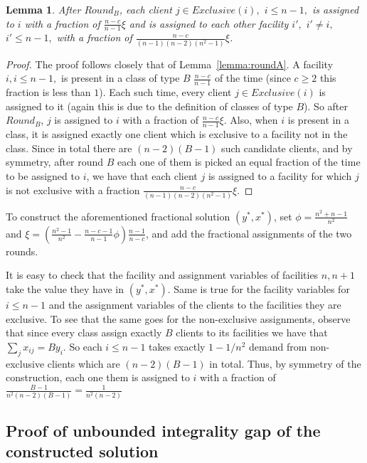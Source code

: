 \documentclass[11pt]{article}\usepackage{amsmath}
\newtheorem{lemma}{Lemma}[section]
\begin{document}
\begin{lemma}   \label{lemma:roundB}
After  $Round_B$,  each client  $j  \in  Exclusive(i),$  $i\leq n-1,$  is
assigned  to $i$  with a  fraction of  $\frac{n-c}{n-1} \xi$  and is
assigned to each other  facility $i',$ $i' \neq i,$ $i'  \leq n-1,$ with a
fraction of $\frac{n-c}{(n-1)(n-2)(n^2-1)} \xi$.
\end{lemma}


\begin{proof}
The proof  follows closely that of  Lemma~\ref{lemma:roundA}. A  facility $i, i
\leq n-1,$  is present in  a class of  type $B$ $\frac{n-c}{n-1}$  of the
time (since  $c \geq  2$ this  fraction is less  than $1$).  Each such
time, every  client $j  \in Exclusive(i)$ is  assigned to  it (again
this  is due  to the  definition  of classes  of type  $B$). So  after
$Round_B$,   $j$   is  assigned   to   $i$   with   a  fraction   of
$\frac{n-c}{n-1} \xi$.  
Also, when $i$  is  present  in a  class, it is assigned exactly one client
which is exclusive to a facility
not in the class. Since in total there are $(n-2)(B-1)$ such candidate clients,
and by symmetry, after round $B$ 
each one of them is picked an equal fraction of the time to
be assigned to $i$, we have that
each client $j$ is assigned to a facility for which $j$ is not
exclusive with  a fraction
$\frac{n-c}{(n-1)(n-2)(n^2-1)} \xi$.
\end{proof}


\noindent
To  construct  the   aforementioned  fractional  solution $(y^*,x^*)$,  set  $\phi=
\frac{n^2+n-1}{n^2}$    and     $\xi=    (\frac{n^2-1}{n^2}-\frac{n-c-1}{n-1}\phi)
\frac{n-1}{n-c}$, and  add the  fractional assignments of  the two
rounds. 

It is easy to check that the facility and assignment variables of facilities $n,n+1$
take the value they have in $(y^*,x^*)$. Same is true for the facility variables for $i \leq n-1$
and the assignment variables of the clients to the facilities they are exclusive. 
To see that the same goes for the non-exclusive assignments, observe that since
every class assign exactly $B$ clients to its facilities we have that $\sum_j x_{ij}=By_i$.
So each $i\leq n-1$ takes exactly $1-1/n^2$ demand from non-exclusive clients which  are
$(n-2)(B-1)$ in total. Thus, by symmetry of the construction, each one them is assigned to $i$
with a fraction of $\frac{B-1}{n^2(n-2)(B-1)}=\frac{1}{n^2(n-2)}$

\subsection{Proof of unbounded integrality gap of the constructed solution}
\end{document}
